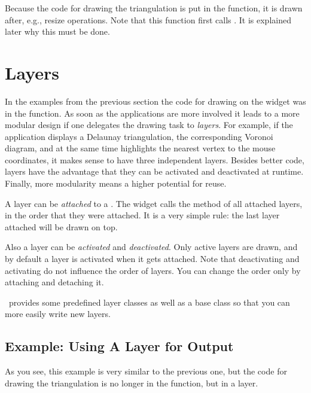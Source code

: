 
Because the code for drawing the triangulation is put in the
 function, it is drawn after, e.g., resize
operations. Note that this function first calls
. It is explained later why this must be
done.

\section{Layers}
\label{Qt_widget_layers}

In the examples from the previous section the code for drawing on the
widget was in the  function. As soon as the applications are more 
involved it leads to a more modular design if one delegates the drawing task to {\em layers}. 
For example, if the application displays a Delaunay triangulation, the corresponding Voronoi diagram,
 and at the same time highlights the nearest vertex to the mouse coordinates, it makes
sense to have three independent layers. Besides better code, layers have the advantage that they
can be activated and deactivated at runtime. Finally, more modularity means a higher potential
for reuse.

A layer can be {\em attached} to a . The widget calls
the method  of all attached layers, in the
order that they were attached. It is a very simple rule: the last layer
attached will be drawn on top.

Also a layer can be {\em activated} and {\em deactivated}. Only active
layers are drawn, and by default a layer is activated when it gets
attached.  Note that deactivating and activating do not influence the
order of layers. You can change the order only by attaching and
detaching it.


\cgal\ provides some predefined layer classes as well as a base class
so that you can more easily write new layers.


\subsection{Example: Using A Layer for Output}

As you see, this example is very similar to the previous one, but
the code for drawing the triangulation is no longer in the 
 function, but in a layer.

